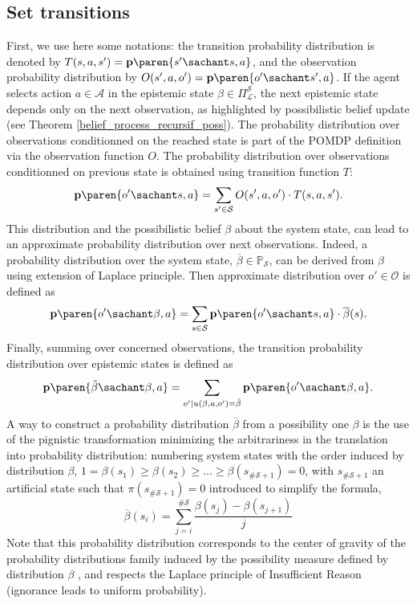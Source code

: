 \subsection{Set transitions}
\label{setTrans}
First, we use here some notations:
the transition probability distribution is denoted by $T(s,a,s') = \textbf{p} \paren{s' \sachant s,a}$,
and the observation probability distribution by $O(s',a,o') = \textbf{p} \paren{ o' \sachant s',a}$.
If the agent selects action $a \in \mathcal{A}$ in the 
epistemic state $\beta \in \Pi^{\mathcal{S}}_{\mathcal{L}}$, 
the next epistemic state depends only on the next observation,
as highlighted by possibilistic belief update (see Theorem \ref{belief_process_recursif_poss}).
 The probability distribution over observations conditionned on the 
reached state is part of the POMDP definition via the observation function $O$. 
The probability distribution over observations conditionned on previous state is obtained using transition function $T$:
\[ \textbf{p} \paren{ o' \sachant s,a } = \sum_{s' \in \mathcal{S}} O(s',a,o') \cdot T(s,a,s') . \]
This distribution and the possibilistic belief $\beta$ about the system state, 
can lead to an approximate probability distribution over next observations. Indeed,
a probability distribution over the system state, 
$\overline{\beta} \in \mathbb{P}_{\mathcal{S}}$, 
can be derived from $\beta$
using extension of Laplace principle.
Then approximate distribution over $o' \in \mathcal{O}$ is defined as
\begin{equation}
\label{obsProb}
\textbf{p} \paren{ o' \sachant \beta,a  } = \sum_{s \in \mathcal{S}} \textbf{p} \paren{ o' \sachant s, a } \cdot \overline{\beta}(s) .
\end{equation}
Finally, summing over concerned observations,
the transition probability distribution 
over epistemic states is defined as
\begin{equation}
\label{epistemTrans}
\textbf{p} \paren{ \tilde{\beta} \sachant \beta, a } = \sum_{o' | u(\beta,a,o')=\tilde{\beta }} \textbf{p} \paren{ o' \sachant \beta,a  }.
\end{equation}
A way to construct a probability distribution $\overline{\beta}$ from
a possibility one $\beta$ is the use of the pignistic transformation
\cite{Du2006.7} minimizing the arbitrariness
in the translation into probability distribution:
numbering system states with the order induced by distribution $\beta$,
$1 = \beta(s_1) \geqslant \beta(s_2) \geqslant 
\ldots \geqslant \beta(s_{\# \mathcal{S}+1}) = 0$, 
with $s_{\# \mathcal{S}+1}$ an artificial state such that $\pi(s_{\# \mathcal{S}+1})=0$ 
introduced to simplify the formula,
\begin{equation}
\label{transform} \overline{\beta}(s_i) = \sum_{j=i}^{\# \mathcal{S}} \frac{\beta(s_j) - \beta(s_{j+1})}{j}
\end{equation}
Note that this probability distribution corresponds to the center of gravity
of the probability distributions family induced by the possibility measure 
defined by distribution $\beta$ \cite{Dubois93onpossibility/probability}, and
respects the Laplace principle of Insufficient Reason (ignorance 
leads to uniform probability).

